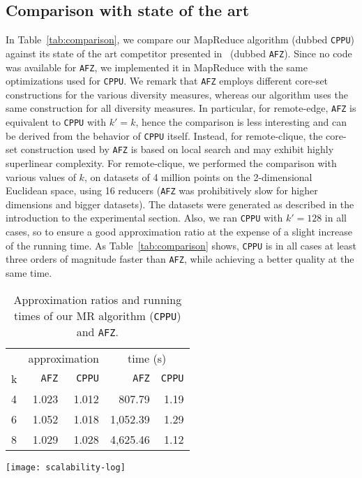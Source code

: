 \documentclass{article}
\begin{document}
\subsection{Comparison with state of the art}

In Table~\ref{tab:comparison}, we compare our MapReduce algorithm
(dubbed {\tt CPPU}) against its state of the art competitor presented
in~\cite{AghamolaeiFZ15} (dubbed {\tt AFZ}). Since no code was
available for {\tt AFZ}, we implemented it in MapReduce with the same
optimizations used for {\tt CPPU}.  We remark that {\tt AFZ} employs
different core-set constructions for the various diversity measures,
whereas our algorithm uses the same construction for all diversity
measures.  In particular, for remote-edge, {\tt AFZ} is equivalent to
{\tt CPPU} with $k'=k$, hence the comparison 
is less interesting and can be derived from the behavior
of {\tt CPPU} itself. Instead, for remote-clique, the core-set
construction used by {\tt AFZ} is based on local search and may
exhibit highly superlinear complexity.  For remote-clique, we
performed the comparison with various values of $k$, on datasets of 4
million points on the 2-dimensional Euclidean space, using 16 reducers
({\tt AFZ} was prohibitively slow for higher dimensions and bigger
datasets).  The datasets were generated as described in the
introduction to the experimental section. Also, we ran {\tt CPPU} with
$k'=128$ in all cases, so to ensure a good approximation ratio at the
expense of a slight increase of the running time.
As Table~\ref{tab:comparison} shows, {\tt CPPU} is in all cases at least
three orders of magnitude faster than {\tt AFZ}, while achieving a better quality at the same time.


\begin{table}[t]
  \begin{minipage}{.43\linewidth}
    \centering
    \begin{tabular}{lrrrr}
      \toprule
      & \multicolumn{2}{c}{approximation} & \multicolumn{2}{c}{time (s)} \\
      k & {\tt AFZ} & {\tt CPPU} & {\tt AFZ} & {\tt CPPU} \\
      \midrule
      4 &        1.023 &     1.012 &     807.79 &  1.19 \\
      6 &        1.052 &     1.018 &    1,052.39 & 1.29 \\
      8 &        1.029 &     1.028 &    4,625.46 & 1.12 \\
      \bottomrule
    \end{tabular}
    \caption{Approximation ratios and running times
      of our MR algorithm ({\tt CPPU}) and {\tt AFZ}.}
    \label{tab:comparison}
  \end{minipage}
  \hfill
  \begin{minipage}{.54\linewidth}
    \centering
    \texttt{[image: scalability-log]}
    \label{fig:scalability}
  \end{minipage}
\end{table}
\end{document}

